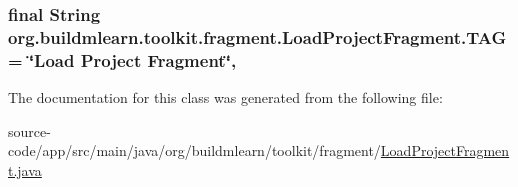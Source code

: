 \subsubsection[{\texorpdfstring{T\+AG}{TAG}}]{\setlength{\rightskip}{0pt plus 5cm}final String org.\+buildmlearn.\+toolkit.\+fragment.\+Load\+Project\+Fragment.\+T\+AG = \char`\"{}Load Project Fragment\char`\"{}\hspace{0.3cm}{\ttfamily [static]}, {\ttfamily [private]}}\hypertarget{classorg_1_1buildmlearn_1_1toolkit_1_1fragment_1_1LoadProjectFragment_a99d74143504259fcd70442cd20b38bde}{}\label{classorg_1_1buildmlearn_1_1toolkit_1_1fragment_1_1LoadProjectFragment_a99d74143504259fcd70442cd20b38bde}


The documentation for this class was generated from the following file\+:\begin{DoxyCompactItemize}
\item 
source-\/code/app/src/main/java/org/buildmlearn/toolkit/fragment/\hyperlink{LoadProjectFragment_8java}{Load\+Project\+Fragment.\+java}\end{DoxyCompactItemize}
